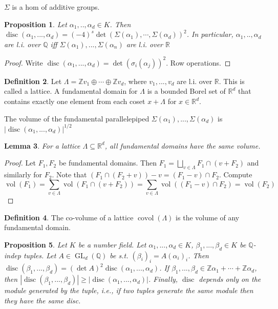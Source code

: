 \documentclass{article}
\theoremstyle{definition}
\newtheorem{defn}{Definition}[section]
\theoremstyle{remark}
\theoremstyle{plain}
\newtheorem{lem}[defn]{Lemma}
\newtheorem{prop}[defn]{Proposition}
\newcommand{\ZZ}{\mathbb{Z}}
\newcommand{\QQ}{\mathbb{Q}}
\newcommand{\RR}{\mathbb{R}}
\newcommand{\disc}{\operatorname{disc}}
\begin{document}
$\Sigma$ is a hom of additive groups.
\begin{prop}
    Let $\alpha_1,..,\alpha_d\in K$. Then $\disc(\alpha_1,...,\alpha_d)=(-4)^s\det(\Sigma(\alpha_1),\cdots,\Sigma(\alpha_d))^2$.
    In particular, $\alpha_1,..,\alpha_d$ are l.i. over $\QQ$ iff $\Sigma(\alpha_1),...,\Sigma(\alpha_n)$ are l.i. over $\RR$
\end{prop}
\begin{proof}
    Write $\disc(\alpha_1,...,\alpha_d)=\det(\sigma_i(\alpha_j))^2$. Row operations.
\end{proof}

\begin{defn}
Let $\Lambda=\ZZ v_1\oplus\cdots\oplus\ZZ v_d$, where $v_1,...,v_d$ are l.i. over $\RR$. This is called a lattice. A fundamental domain for $\Lambda$ is a bounded Borel set of $\RR^d$ that contains exactly one element from each coset $x+\Lambda$ for $x\in\RR^d$.
\end{defn}
The volume of the fundamental parallelepiped $\Sigma(\alpha_1),...,\Sigma(\alpha_d)$ is $|\disc(\alpha_1,...,\alpha_d)|^{1/2}$
\begin{lem}
    For a lattice $\Lambda\subseteq\RR^d$, all fundamental domains have the same volume.
\end{lem}
\begin{proof}
    Let $F_1, F_2$ be  fundamental domains. Then $F_1=\bigsqcup_{v\in\Lambda}F_1\cap(v+F_2)$ and similarly for $F_2$. Note that $(F_1\cap (F_2+v))-v=(F_1-v)\cap F_2$. Compute
    \[\operatorname{vol}(F_1)=\sum_{v\in\Lambda}\operatorname{vol}(F_1\cap (v+F_2))=\sum_{v\in\Lambda}\operatorname{vol}((F_1-v)\cap F_2)=\operatorname{vol}(F_2)\]
\end{proof}
\begin{defn}
    The co-volume of a lattice $\operatorname{covol}(\Lambda)$ is the volume of any fundamental domain.
\end{defn}
\begin{prop}
    Let $K$ be a number field.
    Let $\alpha_1,...,\alpha_d\in K$, $\beta_1,...,\beta_d\in K$ be $\QQ$-indep tuples. Let $A\in\operatorname{GL}_d(\QQ)$ be s.t. $(\beta_i)_i=A(\alpha_i)_i$. Then $\disc(\beta_1,...,\beta_d)=(\det A)^2\disc(\alpha_1,...,\alpha_d)$. If $\beta_1,...,\beta_d\in \ZZ\alpha_1+\cdots+\ZZ\alpha_d$, then $|\disc(\beta_1,...,\beta_d)|\ge|\disc(\alpha_1,...,\alpha_d)|$. Finally, $\disc$ depends only on the module generated by the tuple, i.e., if two tuples generate the same module then they have the same disc.
\end{prop}
\end{document}
